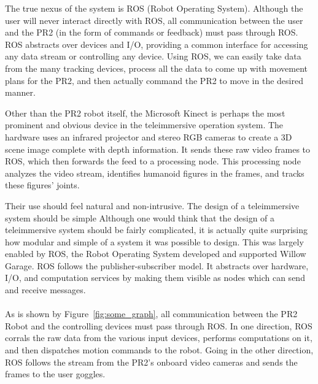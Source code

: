 \documentclass{sig-alternate}
\begin{document}
The true nexus of the system is ROS (Robot Operating System). Although the
user will never interact directly with ROS, all communication between the
user and the PR2 (in the form of commands or feedback) must pass through ROS.
ROS abstracts over devices and I/O, providing a common interface for accessing
any data stream or controlling any device. Using ROS, we can easily take
data from the many tracking devices, process all the data to come up with
movement plans for the PR2, and then actually command the PR2 to move in the
desired manner.

Other than the PR2 robot itself, the Microsoft Kinect is perhaps the most 
prominent and obvious device in the teleimmersive operation system. The
hardware uses an 
infrared projector and stereo RGB cameras to create a 3D scene image complete
with depth information. It sends these raw video frames to ROS, which then
forwards the feed to a processing node. This processing node analyzes the 
video stream, identifies humanoid figures in the frames, and tracks these 
figures' joints.

Their use should feel natural and non-intrusive. 
The design of a teleimmersive system should be simple
Although one would think that the design of a teleimmersive system should be
fairly complicated, it is actually quite surprising how modular and simple of
a system it was possible to design. This was largely enabled by ROS, the Robot
Operating System developed and supported Willow Garage. ROS follows the
publisher-subscriber model. It abstracts over hardware, I/O, and computation
services by making them visible as nodes which can send and receive messages.
\\
\\As is shown by Figure~\ref{fig:some_graph}, all communication between the 
PR2 Robot and the controlling devices must pass through ROS. In one direction,
ROS corrals the raw data from the various input devices, performs computations
on it, and then dispatches motion commands to the robot. Going in the other
direction, ROS follows the stream from the PR2's onboard video cameras and
sends the frames to the user goggles.
\end{document}
